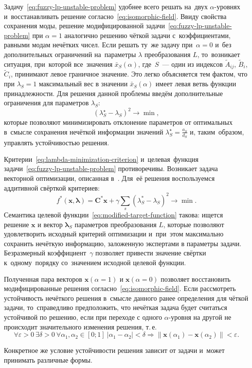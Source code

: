 Задачу~\eqref{eq:fuzzy-lp-unstable-problem} удобнее всего решать на~двух $\alpha$-уровнях и~восстанавливать решение согласно~\eqref{eq:isomorphic-field}. Ввиду свойства сохранения моды, решение модифицированной задачи~\eqref{eq:fuzzy-lp-unstable-problem} при $\alpha=1$ аналогично решению чёткой задачи с~коэффициентами, равными модам нечётких чисел. Если решать ту~же задачу при~$\alpha=0$ и~без дополнительных ограничений на~параметры $\lambda$ преобразования $L$, то~возникает ситуация, при~которой все~значения $\bar{x}_S\left(\alpha \right)$, где~$S$~--- один из индексов $\tilde A_{ij}$, $\tilde B_i$, $\tilde C_i$, принимают левое граничное значение. Это легко объясняется тем фактом, что при $\lambda_S=1$ максимальный вес в значении $\bar{x}_S\left(\alpha \right)$ имеет левая ветвь функции принадлежности. Для решения данной проблемы введём дополнительные ограничения для параметров $\lambda_S$:
\begin{equation}
\label{eq:lambda-minimization-criterion}
  {\left( \lambda_{S}^{\star}-\lambda_S \right)}^2\to \min,
\end{equation}
которые позволяют минимизировать отклонение параметров от оптимальных в~смысле сохранения нечёткой информации значений $\displaystyle \lambda_{S}^{\star}=\frac{a_S}{d_S}$ и, таким~образом, управлять устойчивостью решения. 

Критерии~\eqref{eq:lambda-minimization-criterion} и~целевая~функция задачи~\eqref{eq:fuzzy-lp-unstable-problem} противоречивы. Возникает задача векторной оптимизации, описанная в~\cite{MSU_Optimization}. Для~её решения воспользуемся аддитивной свёрткой критериев:
\begin{equation}
\label{eq:modified-target-function}
  f^{*}\left( \mathbf{x}, \mathbf{\lambda} \right)=\mathbf{C}^{*}\mathbf{x}+\gamma \sum\limits_{s}^{}{\left(\lambda_{S}^{*}-\lambda_S \right)}^{2} \to \min.
\end{equation}
Семантика целевой функции~\eqref{eq:modified-target-function} такова: ищется решение $\mathbf{x}$ и вектор $\mathbf{\lambda}_S$ параметров преобразования $L$, которые позволяют удовлетворить исходный критерий оптимизации и~при~этом максимально сохранить нечёткую информацию, заложенную экспертами в параметры задачи. Безразмерный коэффициент~$\gamma$ позволяет привести значение свёртки к~одному~порядку со~значением исходной целевой функции.

Полученная пара векторов $\mathbf{x}\left( \alpha =1 \right)$ и $\mathbf{x}\left( \alpha =0 \right)$ позволяет восстановить модифицированные решения согласно~\eqref{eq:isomorphic-field}. Если рассмотреть устойчивость нечёткого решения в~смысле данного ранее определения для чёткой задачи, то~справедливо предположить, что нечёткая задача будет считаться устойчивой по решению, если при переходе с одного $\alpha$-уровня на другой не происходит значительного изменения решения, т.\,е.
\begin{equation}
\label{eq:fuzzy-solution-stability}
  \forall \varepsilon >0\ \exists \delta >0\ \forall \alpha_1, \alpha_2 \in \left[0; 1\right]\ \left| \alpha_1-\alpha_2 \right|<\delta \Rightarrow \left\| \mathbf{x}\left( \alpha_1 \right)-\mathbf{x}\left( \alpha_2  \right) \right\|<\varepsilon.
\end{equation}

Конкретное же условие устойчивости решения зависит от задачи и~может принимать различные формы.
